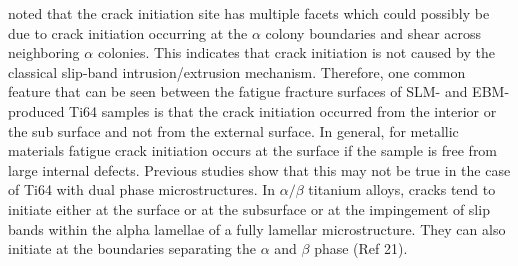 \documentclass[10pt]{article}
\begin{document}
noted that the crack initiation site has multiple facets which could possibly be due to crack initiation occurring at the $\alpha$ colony boundaries and shear across neighboring $\alpha$ colonies. This indicates that crack initiation is not caused by the classical slip-band intrusion/extrusion mechanism. Therefore, one common feature that can be seen between the fatigue fracture surfaces of SLM- and EBM-produced Ti64 samples is that the crack initiation occurred from the interior or the sub surface and not from the external surface. In general, for metallic materials fatigue crack initiation occurs at the surface if the sample is free from large internal defects. Previous studies show that this may not be true in the case of Ti64 with dual phase microstructures. In $\alpha / \beta$ titanium alloys, cracks tend to initiate either at the surface or at the subsurface or at the impingement of slip bands within the alpha lamellae of a fully lamellar microstructure. They can also initiate at the boundaries separating the $\alpha$ and $\beta$ phase (Ref 21).
\end{document}
